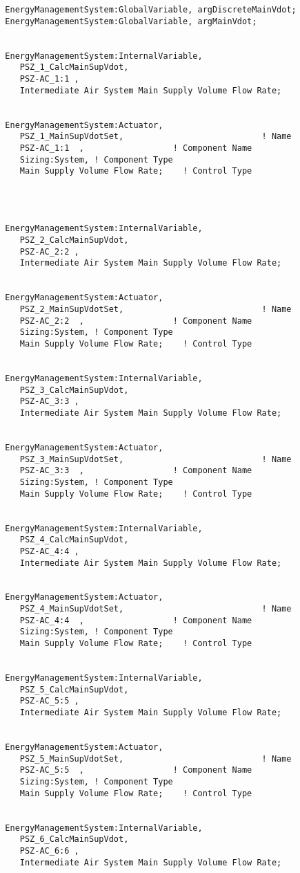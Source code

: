 \begin{lstlisting}
  EnergyManagementSystem:GlobalVariable, argDiscreteMainVdot;
  EnergyManagementSystem:GlobalVariable, argMainVdot;


  EnergyManagementSystem:InternalVariable,
     PSZ_1_CalcMainSupVdot,
     PSZ-AC_1:1 ,
     Intermediate Air System Main Supply Volume Flow Rate;


  EnergyManagementSystem:Actuator,
     PSZ_1_MainSupVdotSet,                            ! Name
     PSZ-AC_1:1  ,                  ! Component Name
     Sizing:System, ! Component Type
     Main Supply Volume Flow Rate;    ! Control Type




  EnergyManagementSystem:InternalVariable,
     PSZ_2_CalcMainSupVdot,
     PSZ-AC_2:2 ,
     Intermediate Air System Main Supply Volume Flow Rate;


  EnergyManagementSystem:Actuator,
     PSZ_2_MainSupVdotSet,                            ! Name
     PSZ-AC_2:2  ,                  ! Component Name
     Sizing:System, ! Component Type
     Main Supply Volume Flow Rate;    ! Control Type


  EnergyManagementSystem:InternalVariable,
     PSZ_3_CalcMainSupVdot,
     PSZ-AC_3:3 ,
     Intermediate Air System Main Supply Volume Flow Rate;


  EnergyManagementSystem:Actuator,
     PSZ_3_MainSupVdotSet,                            ! Name
     PSZ-AC_3:3  ,                  ! Component Name
     Sizing:System, ! Component Type
     Main Supply Volume Flow Rate;    ! Control Type


  EnergyManagementSystem:InternalVariable,
     PSZ_4_CalcMainSupVdot,
     PSZ-AC_4:4 ,
     Intermediate Air System Main Supply Volume Flow Rate;


  EnergyManagementSystem:Actuator,
     PSZ_4_MainSupVdotSet,                            ! Name
     PSZ-AC_4:4  ,                  ! Component Name
     Sizing:System, ! Component Type
     Main Supply Volume Flow Rate;    ! Control Type


  EnergyManagementSystem:InternalVariable,
     PSZ_5_CalcMainSupVdot,
     PSZ-AC_5:5 ,
     Intermediate Air System Main Supply Volume Flow Rate;


  EnergyManagementSystem:Actuator,
     PSZ_5_MainSupVdotSet,                            ! Name
     PSZ-AC_5:5  ,                  ! Component Name
     Sizing:System, ! Component Type
     Main Supply Volume Flow Rate;    ! Control Type


  EnergyManagementSystem:InternalVariable,
     PSZ_6_CalcMainSupVdot,
     PSZ-AC_6:6 ,
     Intermediate Air System Main Supply Volume Flow Rate;



\end{lstlisting}
